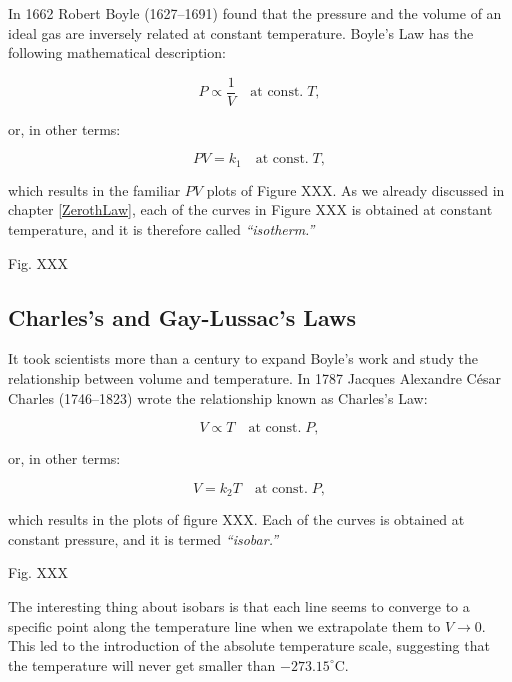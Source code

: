 \documentclass[
  9pt,
]{extbook}
\theoremstyle{definition}
\theoremstyle{definition}
\theoremstyle{definition}
\theoremstyle{remark}
\begin{document}
In 1662 Robert Boyle (1627--1691) found that the pressure and the volume of an ideal gas are inversely related at constant temperature. Boyle's Law has the following mathematical description:

\begin{equation}
P\propto\frac{1}{V}\quad\text{at const.}\;T,
\label{eq:boylelaw1}
\end{equation}

or, in other terms:

\begin{equation}
PV=k_1\quad\text{at const.}\;T,
\label{eq:boylelaw2}
\end{equation}

which results in the familiar \(PV\) plots of Figure XXX. As we already discussed in chapter \ref{ZerothLaw}, each of the curves in Figure XXX is obtained at constant temperature, and it is therefore called \emph{``isotherm.''}

Fig. XXX

\hypertarget{charless-and-gay-lussacs-laws}{%
\subsection{Charles's and Gay-Lussac's Laws}\label{charless-and-gay-lussacs-laws}}

It took scientists more than a century to expand Boyle's work and study the relationship between volume and temperature. In 1787 Jacques Alexandre César Charles (1746--1823) wrote the relationship known as Charles's Law:

\begin{equation}
V\propto T\quad\text{at const.}\;P,
\label{eq:charleslaw1}
\end{equation}

or, in other terms:

\begin{equation}
V=k_2 T\quad\text{at const.}\;P,
\label{eq:charleslaw2}
\end{equation}

which results in the plots of figure XXX. Each of the curves is obtained at constant pressure, and it is termed \emph{``isobar.''}

Fig. XXX

The interesting thing about isobars is that each line seems to converge to a specific point along the temperature line when we extrapolate them to \(V\rightarrow 0\). This led to the introduction of the absolute temperature scale, suggesting that the temperature will never get smaller than \(-273.15^\circ\mathrm{C}\).
\end{document}
